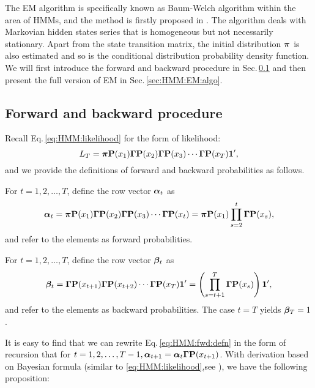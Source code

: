 The EM algorithm is specifically known as Baum-Welch algorithm within the area of HMMs,
and the method is firstly proposed in \cite{Baum:1966cy,Baum:1967gs,Baum:1970do}.
The algorithm deals with Markovian hidden states series 
that is homogeneous but not necessarily stationary.
Apart from the state transition matrix,
the initial distribution ${\boldsymbol\pi}$ is also estimated and 
so is the conditional distribution probability density function.
We will first introduce the forward and backward procedure in Sec.\,\ref{sec:HMM:EM:fwdbwd}
and then present the full version of EM in Sec.\,\ref{sec:HMM:EM:algo}.


\subsection{Forward and backward procedure}
\label{sec:HMM:EM:fwdbwd}
Recall Eq.\,\ref{eq:HMM:likelihood} for the form of likelihood:
		\begin{equation*}
		\label{eq:HMM:likelihood2}
		L_T = {\boldsymbol\pi}{\mathbf P}(x_1){\boldsymbol\Gamma}{\mathbf P}(x_2){\boldsymbol\Gamma}{\mathbf P}(x_3)\cdots{\boldsymbol\Gamma}{\mathbf P}(x_T){\mathbf{1}^{\prime}},
		\end{equation*}
and we provide the definitions of forward and backward probabilities as follows.
		
		\begin{defn}
		\label{defn:fwd}
		For $t = 1,2,\dots,T$, define the row vector ${\boldsymbol\alpha}_t$ as
			\begin{equation}
			\label{eq:HMM:fwd:defn}
			{\boldsymbol\alpha}_t = {\boldsymbol\pi}{\mathbf P}(x_1){\boldsymbol\Gamma}{\mathbf P}(x_2){\boldsymbol\Gamma}{\mathbf P}(x_3)\cdots{\boldsymbol\Gamma}{\mathbf P}(x_t)
			 = {\boldsymbol\pi}{\mathbf P}(x_1)\prod_{s=2}^{t}{\boldsymbol\Gamma}{\mathbf P}(x_s),
			\end{equation}
		and refer to the elements as forward probabilities.
		\end{defn}

		\begin{defn}
		\label{defn:bwd}
		For $t = 1,2,\dots,T$, define the row vector ${\boldsymbol\beta}_t$ as
			\begin{equation}
			\label{eq:HMM:bwd:defn}
			{\boldsymbol\beta}_t = {\boldsymbol\Gamma}{\mathbf P}(x_{t+1}){\boldsymbol\Gamma}{\mathbf P}(x_{t+2})\cdots{\boldsymbol\Gamma}{\mathbf P}(x_T){\mathbf{1}^{\prime}}
			 = \left(\prod_{s=t+1}^{T}{\boldsymbol\Gamma}{\mathbf P}(x_s)\right){\mathbf{1}^{\prime}},
			\end{equation}
		and refer to the elements as backward probabilities. 
		The case $t = T$ yields ${\boldsymbol\beta}_T = 1$.
		\end{defn}

It is easy to find that we can rewrite Eq.\,\ref{eq:HMM:fwd:defn} in the form of recursion that 
for $t = 1,2,\dots,T-1, {\boldsymbol\alpha}_{t+1} = {\boldsymbol\alpha}_t{\boldsymbol\Gamma}{\mathbf P}(x_{t+1})$.
With derivation based on Bayesian formula 
(similar to \ref{eq:HMM:likelihood},see \cite{Zucchini:2009df}),
we have the following proposition:

